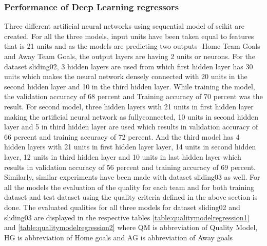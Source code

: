 \subsubsection{Performance of Deep Learning regressors}
Three different artificial neural networks using sequential model of scikit are created. For all the three models, input units have been taken equal to features that is 21 units and as the models are predicting two outputs- Home Team Goals and Away Team Goals, the output layers are having 2 units or neurons. For the dataset sliding02, 3 hidden layers are used from which first hidden layer has 30 units which makes the neural network densely connected with 20 units in the second hidden layer and 10 in the third hidden layer. While training the model, the validation accuracy of 68 percent and Training accuracy of 70 percent was the result. For second model, three hidden layers with 21 units in first hidden layer making the artificial neural network as fullyconnected, 10 units in second hidden layer and 5 in third hidden layer are used which results in validation accuracy of 66 percent and training accuracy of 72 percent. 
And the third model has 4 hidden layers with 21 units in first hidden layer layer, 14 units in second hidden layer, 12 units in third hidden layer and 10 units in last hidden layer which results in validation accuracy of 56 percent and training accuracy of 69 percent.\newline
Similarly, similar experiments have been made with dataset sliding03 as well. For all the models the evaluation of the quality for each team and for both training dataset and test dataset using the quality criteria defined in the above section is done. The evaluated qualities for all three models for dataset sliding02 and sliding03 are displayed in the respective tables \autoref{table:qualitymodelregression1} and \autoref{table:qualitymodelregression2} where QM is abbreviation of Quality Model, HG is abbreviation of Home goals and AG is abbreviation of Away goals\newline

\begin{table}
\centering
{}
\caption{ Quality Model for models with different hidden units for dataset sliding02}
\label{table:qualitymodelregression1}
\end{table}




